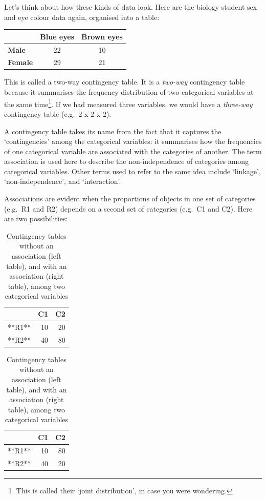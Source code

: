 \documentclass[
]{book}
\begin{document}
Let's think about how these kinds of data look. Here are the biology student sex and eye colour data again, organised into a table:

\begin{longtable}[]{@{}lcc@{}}
\toprule
& Blue eyes & Brown eyes \\
\midrule
\endhead
\textbf{Male} & 22 & 10 \\
\textbf{Female} & 29 & 21 \\
\bottomrule
\end{longtable}

This is called a two-way contingency table. It is a \emph{two-way} contingency table because it summarises the frequency distribution of two categorical variables at the same time\footnote{This is called their `joint distribution', in case you were wondering.}. If we had measured three variables, we would have a \emph{three-way} contingency table (e.g.~2 x 2 x 2).

A contingency table takes its name from the fact that it captures the `contingencies' among the categorical variables: it summarises how the frequencies of one categorical variable are associated with the categories of another. The term association is used here to describe the non-independence of categories among categorical variables. Other terms used to refer to the same idea include `linkage', `non-independence', and `interaction'.

Associations are evident when the proportions of objects in one set of categories (e.g.~R1 and R2) depends on a second set of categories (e.g.~C1 and C2). Here are two possibilities:

\begin{table}
\caption{\label{tab:unnamed-chunk-206}Contingency tables without an association (left table), 
             and with an association (right table), among two categorical variables}

\centering
\begin{tabular}[t]{lrr}
\toprule
  & C1 & C2\\
\midrule
**R1** & 10 & 20\\
**R2** & 40 & 80\\
\bottomrule
\end{tabular}
\centering
\begin{tabular}[t]{lrr}
\toprule
  & C1 & C2\\
\midrule
**R1** & 10 & 80\\
**R2** & 40 & 20\\
\bottomrule
\end{tabular}
\end{table}
\end{document}
